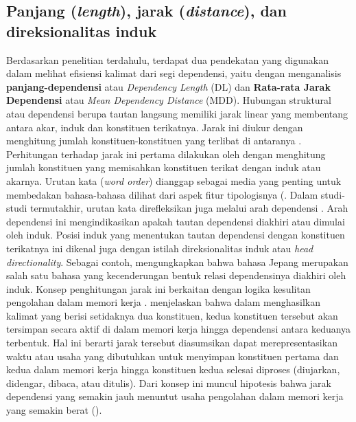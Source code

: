 \subsection{Panjang (\textit{length}), jarak (\textit{distance}), dan direksionalitas induk}

Berdasarkan penelitian terdahulu, terdapat dua pendekatan yang digunakan dalam melihat efisiensi kalimat dari segi dependensi, yaitu dengan menganalisis \textbf{\Gls{panjang-dependensi}} atau \textit{Dependency Length} (DL) dan \textbf{Rata-rata Jarak Dependensi} atau \textit{Mean Dependency Distance} (MDD).  Hubungan struktural atau dependensi berupa tautan langsung memiliki jarak linear yang membentang antara akar, induk dan konstituen terikatnya. Jarak ini diukur dengan menghitung jumlah konstituen-konstituen yang terlibat di antaranya \citep{heringer1980syntax}. Perhitungan terhadap jarak ini pertama dilakukan oleh \cite{heringer1980syntax} dengan menghitung jumlah konstituen yang memisahkan konstituen terikat dengan induk atau akarnya. Urutan kata (\textit{word order}) dianggap sebagai media yang penting untuk membedakan bahasa-bahasa dilihat dari aspek fitur tipologisnya (\citealp{greenberg1963some, dryer1992greenbergian}. Dalam studi-studi termutakhir, urutan kata direfleksikan juga melalui arah dependensi \citep{hudson2007language}. Arah dependensi ini mengindikasikan apakah tautan dependensi diakhiri atau dimulai oleh induk. Posisi induk yang menentukan tautan dependensi dengan konstituen terikatnya ini dikenal juga dengan istilah direksionalitas induk atau \textit{head directionality}. Sebagai contoh, \cite{hudson2003psychological} mengungkapkan bahwa bahasa Jepang merupakan salah satu bahasa yang kecenderungan bentuk relasi dependensinya diakhiri oleh induk. Konsep penghitungan jarak ini berkaitan dengan logika kesulitan pengolahan dalam memori kerja \citep{hudson2007language}. \cite{hudson2007language} menjelaskan bahwa dalam menghasilkan kalimat yang berisi setidaknya dua konstituen, kedua konstituen tersebut akan tersimpan secara aktif di dalam memori kerja hingga dependensi antara keduanya terbentuk. Hal ini berarti jarak tersebut diasumsikan dapat merepresentasikan waktu atau usaha yang dibutuhkan untuk menyimpan konstituen pertama dan kedua dalam memori kerja hingga konstituen kedua selesai diproses (diujarkan, didengar, dibaca, atau ditulis). Dari konsep ini muncul hipotesis bahwa jarak dependensi yang semakin jauh menuntut usaha pengolahan dalam memori kerja yang semakin berat (\citealp{hudson2007language, gibson1998linguistic}).

